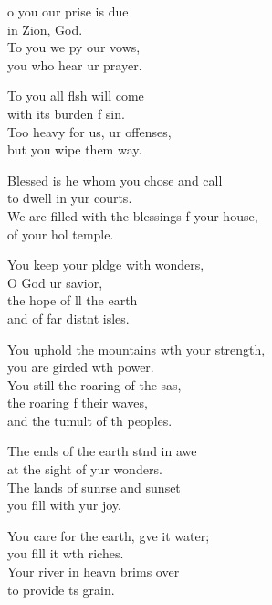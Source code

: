\settowidth{\versewidth}{We are filled with the blessings of your house, *}
\begin{psalmverse}%
  \begin{patverse}
o you our prise is due\Med\\
in Zion,  God.\\
To you we py our vows,\Med\\
you who hear ur prayer.

To you all flsh will come\Med\\
with its burden f sin.\\
Too heavy for us, ur offenses,\Med\\
but you wipe them way.

Blessed is he whom you chose and call\Med\\
to dwell in yur courts.\\
We are filled with the blessings f your house,\Med\\
of your hol temple.

You keep your pldge with wonders,\Med\\
O God ur savior,\\
the hope of ll the earth\Med\\
and of far distnt isles.

You uphold the mountains w\pointup{\i}th your strength,\Med\\
you are girded w\pointup{\i}th power.\\
You still the roaring of the sas,\Flex\\
the roaring f their waves,\Med\\
and the tumult of th peoples.

The ends of the earth stnd in awe\Med\\
at the sight of yur wonders.\\
The lands of sunr\pointup{\i}se and sunset\Med\\
you fill with yur joy.

You care for the earth, g\pointup{\i}ve it water;\Med\\
you fill it w\pointup{\i}th riches.\\
Your river in heavn brims over\Med\\
to provide \pointup{\i}ts grain.


\end{patverse}
\end{psalmverse}

